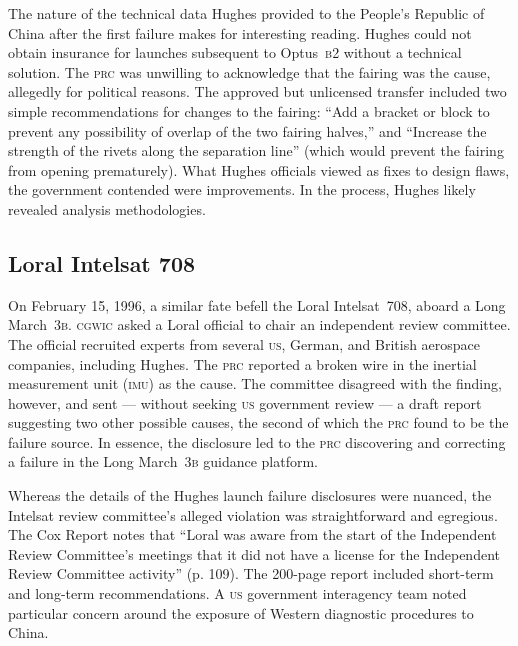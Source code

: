 \documentclass[12pt]{olfmemo}
\begin{document}
The nature of the technical data Hughes provided to the People's Republic of China after the first failure makes for interesting reading. Hughes could not obtain insurance for launches subsequent to Optus~\textsc{b2} without a technical solution. The \textsc{prc} was unwilling to acknowledge that the fairing was the cause, allegedly for political reasons. The approved but unlicensed transfer included two simple recommendations for changes to the fairing: ``Add a bracket or block to prevent any possibility of overlap of the two fairing halves,'' and ``Increase the strength of the rivets along the separation line'' (which would prevent the fairing from opening prematurely). What Hughes officials viewed as fixes to design flaws, the government contended were improvements. In the process, Hughes likely revealed analysis methodologies. \citep{Cox1999} %

\subsection{Loral Intelsat 708}
On February 15, 1996, a similar fate befell the Loral Intelsat~708, aboard a Long March~\textsc{3b}. \textsc{cgwic} asked a Loral official to chair an independent review committee. The official recruited experts from several \textsc{us}, German, and British aerospace companies, including Hughes. The \textsc{prc} reported a broken wire in the inertial measurement unit (\textsc{imu}) as the cause. The committee disagreed with the finding, however, and sent --- without seeking \textsc{us} government review --- a draft report suggesting two other possible causes, the second of which the \textsc{prc} found to be the failure source. In essence, the disclosure led to the \textsc{prc} discovering and correcting a failure in the Long March~\textsc{3b} guidance platform. \citep{Cox1999}

Whereas the details of the Hughes launch failure disclosures were nuanced, the Intelsat review committee's alleged violation was straightforward and egregious. The Cox Report notes that ``Loral was aware from the start of the Independent Review Committee's meetings that it did not have a license for the Independent Review Committee activity'' (p. 109). The 200-page report included short-term and long-term recommendations. A \textsc{us} government interagency team noted particular concern around the exposure of Western diagnostic procedures to China. \citep{Cox1999}
\end{document}
